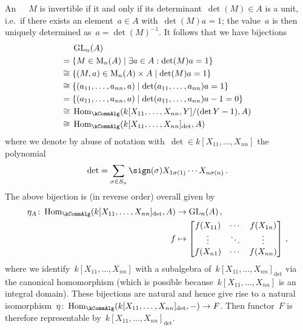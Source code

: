 An~~~$M$ is invertible if it and only if its determinant~$\det(M) \in A$ is a unit, i.e.\ if there exists an element~$a \in A$ with~$\det(M) a = 1$;
the value~$a$ is then uniquely determined as~$a = \det(M)^{-1}$.
It follows that we have bijections
\begin{align*}
       {}&  \GL_n(A)  \\
      ={}&  \{ M \in \mat{n}{A} \suchthat \exists a \in A : \det(M) a  = 1 \} \\
  \cong{}&  \{ (M,a) \in \mat{n}{A} \times A \suchthat \det(M) a = 1 \} \\
  \cong{}&  \{ (a_{11}, \dotsc, a_{nn}, a) \suchthat \det(a_{11}, \dotsc, a_{nn}) a = 1 \}  \\
      ={}&  \{ (a_{11}, \dotsc, a_{nn}, a) \suchthat \det(a_{11}, \dotsc, a_{nn}) a - 1 = 0 \}  \\
  \cong{}&  \Hom_{\kCommAlg}(k[X_{11}, \dotsc, X_{nn}, Y]/(\det Y - 1), A)  \\
  \cong{}&  \Hom_{\kCommAlg}(k[X_{11}, \dotsc, X_{nn}]_{\det}, A)
\end{align*}
where we denote by abuse of notation with~$\det \in k[X_{11}, \dotsc, X_{nn}]$ the polynomial
\[
    \det
  = \sum_{\sigma \in S_n} \sign(\sigma) X_{1 \sigma(1)} \dotsm X_{n \sigma(n)} \,.
\]
The above bijection is (in reverse order) overall given by
\begin{align*}
            \eta_A
   \colon   \Hom_{\kCommAlg}(k[X_{11}, \dotsc, X_{nn}]_{\det}, A)
  &\to      \GL_n(A) \,,
  \\
            f
  &\mapsto  \begin{bmatrix}
              f(X_{11}) & \cdots  & f(X_{1n}) \\
              \vdots    & \ddots  & \vdots    \\
              f(X_{n1}) & \cdots  & f(X_{nn})
            \end{bmatrix} \,,
\end{align*}
where we identify~$k[X_{11}, \dotsc, X_{nn}]$ with a subalgebra of~$k[X_{11}, \dotsc, X_{nn}]_{\det}$ via the canonical homomorphism (which is possible because~$k[X_{11}, \dotsc, X_{nn}]$ is an integral domain).
These bijections are natural and hence give rise to a natural isomorphism~$\eta \colon \Hom_{\kCommAlg}(k[X_{11}, \dotsc, X_{nn}]_{\det}, -) \to F$.
Then functor~$F$ is therefore representable by~$k[X_{11}, \dotsc, X_{nn}]_{\det}$.







